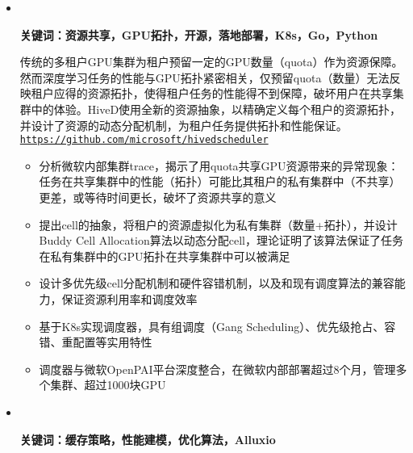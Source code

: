  \begin{itemize}[leftmargin=*]
    \item
      \vspace{-10pt}\\
      {\small
          \textbf{关键词：资源共享，GPU拓扑，开源，落地部署，K8s，Go，Python}

          传统的多租户GPU集群为租户预留一定的GPU数量（quota）作为资源保障。然而深度学习任务的性能与GPU拓扑紧密相关，仅预留quota（数量）无法反映租户应得的资源拓扑，使得租户任务的性能得不到保障，破坏用户在共享集群中的体验。HiveD使用全新的资源抽象，以精确定义每个租户的资源拓扑，并设计了资源的动态分配机制，为租户任务提供拓扑和性能保证。\texttt{\url{https://github.com/microsoft/hivedscheduler}}
          \vspace{-5pt}
          \begin{itemize}[leftmargin=*]
            \item 分析微软内部集群trace，揭示了用quota共享GPU资源带来的异常现象：任务在共享集群中的性能（拓扑）可能比其租户的私有集群中（不共享）更差，或等待时间更长，破坏了资源共享的意义
            \item 提出cell的抽象，将租户的资源虚拟化为私有集群（数量+拓扑），并设计Buddy Cell Allocation算法以动态分配cell，理论证明了该算法保证了任务在私有集群中的GPU拓扑在共享集群中可以被满足
            \item 设计多优先级cell分配机制和硬件容错机制，以及和现有调度算法的兼容能力，保证资源利用率和调度效率
            \item 基于K8s实现调度器，具有组调度（Gang Scheduling）、优先级抢占、容错、重配置等实用特性
            \item 调度器与微软OpenPAI平台深度整合，在微软内部部署超过8个月，管理多个集群、超过1000块GPU
          \end{itemize}
      }
    \item
      \vspace{-10pt}\\
      {\small
          \textbf{关键词：缓存策略，性能建模，优化算法，Alluxio}

}
\end{itemize}
